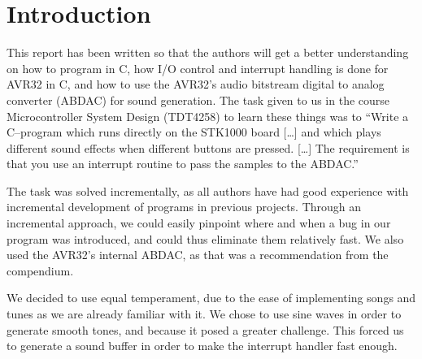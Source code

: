 \section{Introduction}

This report has been written so that the authors will get a better
understanding on how to program in C, how I/O control and interrupt
handling is done for AVR32 in C, and how to use the AVR32's audio
bitstream digital to analog converter (ABDAC) for sound generation. The
task given to us in the course Microcontroller System Design (TDT4258)
to learn these things was to ``Write a C–program which runs
directly on the STK1000 board [\ldots] and which plays different sound
effects when different buttons are pressed. [\ldots] The requirement is
that you use an interrupt routine to pass the samples to the ABDAC.''\cite{comp}

The task was solved incrementally, as all authors have had good experience
with incremental development of programs in previous projects. Through
an incremental approach, we could easily pinpoint where and when a bug
in our program was introduced, and could thus eliminate them relatively
fast. We also used the AVR32's internal ABDAC, as that was a
recommendation from the compendium.

We decided to use equal temperament, due to the ease of implementing
songs and tunes as we are already familiar with it. We chose to use sine
waves in order to generate smooth tones, and because it posed a greater
challenge. This forced us to generate a sound buffer in order to make
the interrupt handler fast enough.
